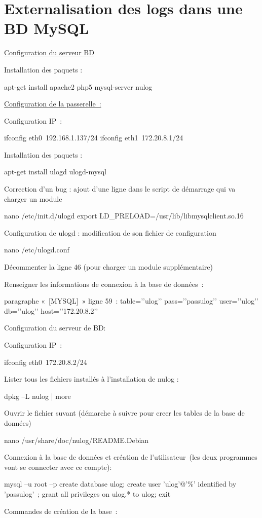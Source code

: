 \documentclass[12pt]{report}
\begin{document}
\chapter{Externalisation des logs dans une BD MySQL}
\underline{Configuration du serveur BD}

Installation des paquets :

apt-get install apache2 php5 mysql-server nulog

\underline{Configuration de la passerelle : }

Configuration IP :

ifconfig eth0 192.168.1.137/24
ifconfig eth1 172.20.8.1/24

Installation des paquets :

apt-get install ulogd ulogd-mysql

Correction d'un bug : ajout d’une ligne dans le script de démarrage qui va charger un module

nano /etc/init.d/ulogd
export LD_PRELOAD=/usr/lib/libmysqlclient.so.16

Configuration de ulogd : modification de son fichier de configuration

nano /etc/ulogd.conf

Décommenter la ligne 46 (pour charger un module supplémentaire)

Renseigner les informations de connexion à la base de données :

paragraphe « [MYSQL] » ligne 59 :
table=’’ulog’’
pass=’’passulog’’
user=’’ulog’’
db=’’ulog’’
host=’’172.20.8.2’’

Configuration du serveur de BD:

Configuration IP :

ifconfig eth0 172.20.8.2/24

Lister tous les fichiers installés à l’installation de nulog :

dpkg –L nulog | more

Ouvrir le fichier suvant (démarche à suivre pour creer les tables de la base de données)

nano /usr/share/doc/nulog/README.Debian

Connexion à la base de données et création de l’utilisateur (les deux programmes vont se connecter avec ce compte):

mysql –u root –p
create database ulog;
create user 'ulog'@'\%' identified by 'passulog' ;
grant all privileges on ulog.* to ulog;
exit

Commandes de création de la base :
\end{document}

